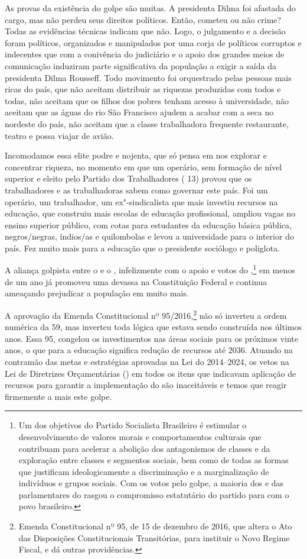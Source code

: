 As provas da existência do golpe são muitas. A presidenta Dilma foi
afastada do cargo, mas não perdeu seus direitos políticos. Então,
cometeu ou não crime? Todas as evidências técnicas indicam que não.
Logo, o julgamento e a decisão foram
políticos, organizados e manipulados por uma corja de políticos
corruptos e indecentes que com a conivência do judiciário e o apoio dos
grandes meios de comunicação induziram parte significativa da população
a exigir a saída da presidenta Dilma Rousseff. Todo movimento foi
orquestrado pelas pessoas mais ricas do país, que não aceitam distribuir
as riquezas produzidas com todos e todas, não aceitam que os filhos dos
pobres tenham acesso à universidade, não aceitam que as águas do rio São
Francisco ajudem a acabar com a seca no nordeste do país, não aceitam
que a classe trabalhadora frequente restaurante, teatro e possa viajar
de avião.

Incomodamos essa elite podre e nojenta, que só pensa em nos explorar e
concentrar riqueza, no momento em que um operário, sem formação de nível
superior e eleito pelo Partido dos Trabalhadores ( 13) provou que os
trabalhadores e as trabalhadoras sabem como governar este país. Foi um
operário, um trabalhador, um ex"-sindicalista que mais investiu recursos
na educação, que construiu mais escolas de educação profissional,
ampliou vagas no ensino superior público, com cotas para estudantes da
educação básica pública, negros/negras, índios/as e quilombolas e levou
a universidade para o interior do país. Fez muito mais para a educação
que o presidente sociólogo e poliglota.

A aliança golpista entre o  e o , infelizmente com o apoio
e votos do ,\footnote{Um dos objetivos do Partido
  Socialista Brasileiro é estimular o desenvolvimento de
  valores morais e comportamentos culturais que contribuam para acelerar
  a abolição dos antagonismos de classes e da exploração entre classes e
  segmentos sociais, bem como de todas as formas que justificam
  ideologicamente a discriminação e a marginalização de indivíduos e
  grupos sociais. Com os votos pelo golpe, a maioria dos e das
  parlamentares do  rasgou o compromisso estatutário do partido para
  com o povo brasileiro.} em menos de um ano já promoveu uma devassa
na Constituição Federal e continua ameaçando prejudicar a população em
muito mais.

A aprovação da Emenda Constitucional nº 95/2016,\footnote{Emenda
  Constitucional nº 95, de 15 de dezembro de 2016, que altera o Ato das
  Disposições Constitucionais Transitórias, para instituir o Novo Regime
  Fiscal, e dá outras providências.} não só inverteu a ordem numérica
da  59, mas inverteu toda lógica que estava sendo construída nos
últimos anos. Essa  95, congelou os investimentos nas áreas sociais
para os próximos vinte anos, o que para a educação significa redução de
recursos até 2036. Atuando na contramão das metas e estratégias
aprovadas na Lei do  2014--2024, os vetos na Lei de Diretrizes
Orçamentárias () em todos os itens que indicavam aplicação de recursos
para garantir a implementação do  são inaceitáveis e temos que reagir
firmemente a mais este golpe.

